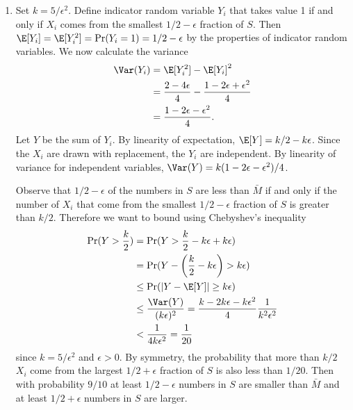 \begin{enumerate}
    \item Set $k=5/\epsilon^2$.
    Define indicator random variable $Y_i$
    that takes value 1 if and only if $X_i$
    comes from the smallest $1/2-\epsilon$
    fraction of $S$.
    Then
    $\E[Y_i] = \E[Y_i^2] =\Pr(Y_i=1) = 1/2-\epsilon$
    by the properties of indicator random variables.
    We now calculate the variance
    \begin{align}
        \Var(Y_i) &= \E[Y_i^2] - \E[Y_i]^2 \nonumber \\
        &=\frac{2-4\epsilon}{4} -
        \frac{1-2\epsilon + \epsilon^2}{4} \nonumber \\
        &= \frac{1-2\epsilon-\epsilon^2}{4}.
        \nonumber
    \end{align}
    Let $Y$ be the sum of $Y_i$.
    By linearity of expectation, $\E[Y] = k/2-k\epsilon$.
    Since the $X_i$ are drawn with replacement,
    the $Y_i$ are independent.
    By linearity of variance for independent variables,
    $\Var(Y) = k(1-2\epsilon-\epsilon^2)/4$.
    
    Observe that $1/2-\epsilon$ of the numbers in $S$
    are less than $\bar{M}$ if and only if the number
    of $X_i$ that come from the smallest $1/2-\epsilon$
    fraction of $S$ is greater than $k/2$.
    Therefore we want to bound
    using Chebyshev's inequality
    \begin{align}
        \Pr(Y > \frac{k}{2}) &=
        \Pr(Y > \frac{k}{2} -k \epsilon + k \epsilon)
        \nonumber \\
        &= \Pr(Y - \left(\frac{k}{2}-k\epsilon\right)>k\epsilon)
        \nonumber \\
        &\leq \Pr(|Y - \E[Y]| \geq k\epsilon)
        \nonumber \\
        &\leq \frac{\Var(Y)}{(k\epsilon)^2} =
        \frac{k-2k\epsilon -k\epsilon^2}{4}\frac{1}{k^2\epsilon^2}
        \nonumber \\
        &< \frac{1}{4k\epsilon^2}
        = \frac{1}{20}
        \nonumber
    \end{align}
    since $k=5/\epsilon^2$ and $\epsilon>0$.
    By symmetry, the probability that more than
    $k/2$ $X_i$ come from the largest $1/2+\epsilon$
    fraction of $S$ is also less than $1/20$.
    Then with probability $9/10$ at least
    $1/2-\epsilon$ numbers in $S$ are smaller
    than $\bar{M}$ and at least 
    $1/2+\epsilon$ numbers in $S$ are larger.
    \qedsymbol
    

\end{enumerate}
